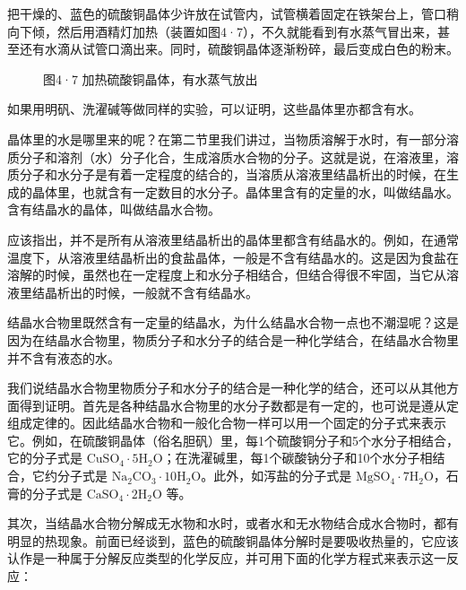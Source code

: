 把干燥的、蓝色的硫酸铜晶体少许放在试管内，试管横着固定在铁架台上，管口稍向下倾，然后用酒精灯加热（装置如图4·7），不久就能看到有水蒸气冒出来，甚至还有水滴从试管口滴出来。同时，硫酸铜晶体逐渐粉碎，最后变成白色的粉末。

\begin{figure}
\centering
\caption{图4·7 加热硫酸铜晶体，有水蒸气放出}
\end{figure}

如果用明矾、洗濯碱等做同样的实验，可以证明，这些晶体里亦都含有水。

晶体里的水是哪里来的呢？在第二节里我们讲过，当物质溶解于水时，有一部分溶质分子和溶剂（水）分子化合，生成溶质水合物的分子。这就是说，在溶液里，溶质分子和水分子是有着一定程度的结合的，当溶质从溶液里结晶析出的时候，在生成的晶体里，也就含有一定数目的水分子。晶体里含有的定量的水，叫做结晶水。含有结晶水的晶体，叫做结晶水合物。

应该指出，并不是所有从溶液里结晶析出的晶体里都含有结晶水的。例如，在通常温度下，从溶液里结晶析出的食盐晶体，一般是不含有结晶水的。这是因为食盐在溶解的时候，虽然也在一定程度上和水分子相结合，但结合得很不牢固，当它从溶液里结晶析出的时候，一般就不含有结晶水。

结晶水合物里既然含有一定量的结晶水，为什么结晶水合物一点也不潮湿呢？这是因为在结晶水合物里，物质分子和水分子的结合是一种化学结合，在结晶水合物里并不含有液态的水。

我们说结晶水合物里物质分子和水分子的结合是一种化学的结合，还可以从其他方面得到证明。首先是各种结晶水合物里的水分子数都是有一定的，也可说是遵从定组成定律的。因此结晶水合物和一般化合物一样可以用一个固定的分子式来表示它。例如，在硫酸铜晶体（俗名胆矾）里，每1个硫酸铜分子和5个水分子相结合，它的分子式是
\(\mathrm{CuSO_4\cdot 5H_2O}\)；在洗濯碱里，每1个碳酸钠分子和10个水分子相结合，它约分子式是
\(\mathrm{Na_2CO_3\cdot 10H_2O}\)。此外，如泻盐的分子式是
\(\mathrm{MgSO_4\cdot 7H_2O}\)，石膏的分子式是
\(\mathrm{CaSO_4\cdot 2H_2O}\) 等。

其次，当结晶水合物分解成无水物和水时，或者水和无水物结合成水合物时，都有明显的热现象。前面已经谈到，蓝色的硫酸铜晶体分解时是要吸收热量的，它应该认作是一种属于分解反应类型的化学反应，并可用下面的化学方程式来表示这一反应：

